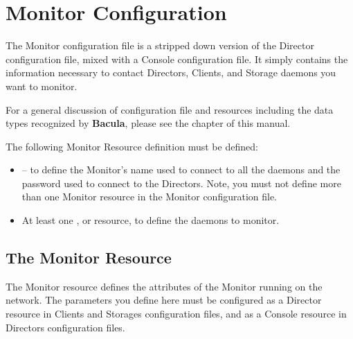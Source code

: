 
\chapter{Monitor Configuration}
\label{_MonitorChapter}

The Monitor configuration file is a stripped down version of the Director
configuration file, mixed with a Console configuration file. It simply
contains the information necessary to contact Directors, Clients, and Storage
daemons you want to monitor. 

For a general discussion of configuration file and resources including the
data types recognized by {\bf Bacula}, please see the 
 chapter of this manual. 

The following Monitor Resource definition must be defined: 

\begin{itemize}
\item 
    -- to  define the Monitor's
   name used to connect to all the daemons and  the password used to connect to
the Directors. Note, you must not  define more than one Monitor resource in
the  Monitor configuration file.  
\item At least one 
   ,  
    or  
 resource, to define the 
daemons to monitor. 
\end{itemize}

\section{The Monitor Resource}
\label{MonitorResource}

The Monitor resource defines the attributes of the Monitor running on the
network. The parameters you define here must be configured as a Director
resource in Clients and Storages configuration files, and as a Console
resource in Directors configuration files. 

